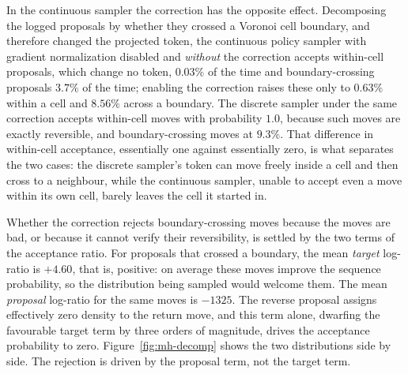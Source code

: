 In the continuous sampler the correction has the opposite effect. Decomposing the logged proposals by whether they crossed a Voronoi cell boundary, and therefore changed the projected token, the continuous policy sampler with gradient normalization disabled and \emph{without} the correction accepts within-cell proposals, which change no token, $0.03\%$ of the time and boundary-crossing proposals $3.7\%$ of the time; enabling the correction raises these only to $0.63\%$ within a cell and $8.56\%$ across a boundary. %
The discrete sampler under the same correction accepts within-cell moves with probability $1.0$, because such moves are exactly reversible, and boundary-crossing moves at $9.3\%$. %
That difference in within-cell acceptance, essentially one against essentially zero, is what separates the two cases: the discrete sampler's token can move freely inside a cell and then cross to a neighbour, while the continuous sampler, unable to accept even a move within its own cell, barely leaves the cell it started in.

Whether the correction rejects boundary-crossing moves because the moves are bad, or because it cannot verify their reversibility, is settled by the two terms of the acceptance ratio. For proposals that crossed a boundary, the mean \emph{target} log-ratio is $+4.60$, that is, positive: on average these moves improve the sequence probability, so the distribution being sampled would welcome them. The mean \emph{proposal} log-ratio for the same moves is $-1325$.
The reverse proposal assigns effectively zero density to the return move, and this term alone, dwarfing the favourable target term by three orders of magnitude, drives the acceptance probability to zero. Figure~\ref{fig:mh-decomp} shows the two distributions side by side. The rejection is driven by the proposal term, not the target term.

